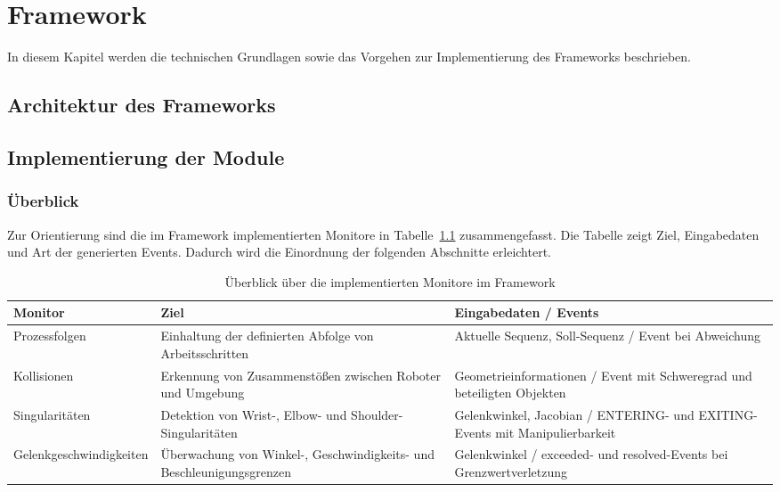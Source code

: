 \chapter{Framework}
\label{sec:framework}

In diesem Kapitel werden die technischen Grundlagen sowie das Vorgehen zur
Implementierung des Frameworks beschrieben.

\section{Architektur des Frameworks}
\label{sec:architektur_frameowork}


\section{Implementierung der Module}

\subsection*{Überblick}
Zur Orientierung sind die im Framework implementierten Monitore in
Tabelle~\ref{tab:monitor_overview_arch} zusammengefasst. Die Tabelle zeigt Ziel,
Eingabedaten und Art der generierten Events. Dadurch wird die Einordnung der
folgenden Abschnitte erleichtert.

\begin{table}[H]
	\centering
	\small
	\begin{tabularx}{\textwidth}{lXX}
		\toprule
		\textbf{Monitor}        & \textbf{Ziel}                                                         & \textbf{Eingabedaten / Events} \\
		\midrule
		Prozessfolgen           & Einhaltung der definierten Abfolge von Arbeitsschritten               &
		Aktuelle Sequenz, Soll-Sequenz / Event bei Abweichung                                                                            \\
		\addlinespace
		Kollisionen             & Erkennung von Zusammenstößen zwischen Roboter und Umgebung            &
		Geometrieinformationen / Event mit Schweregrad und beteiligten Objekten                                                          \\
		\addlinespace
		Singularitäten          & Detektion von Wrist-, Elbow- und Shoulder-Singularitäten              &
		Gelenkwinkel, Jacobian / ENTERING- und EXITING-Events mit Manipulierbarkeit                                                      \\
		\addlinespace
		Gelenkgeschwindigkeiten & Überwachung von Winkel-, Geschwindigkeits- und Beschleunigungsgrenzen &
		Gelenkwinkel / exceeded- und resolved-Events bei Grenzwertverletzung                                                             \\
		\bottomrule
	\end{tabularx}
	\caption{Überblick über die implementierten Monitore im Framework}
	\label{tab:monitor_overview_arch}
\end{table}

